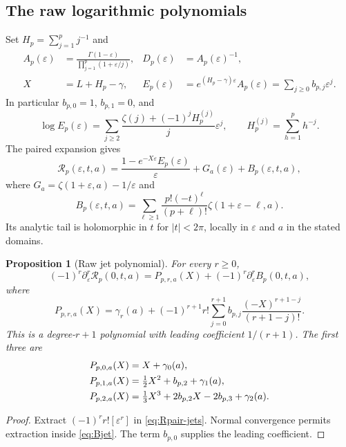\documentclass[11pt,a4paper]{article}
\numberwithin{equation}{section}
\newtheorem{proposition}[theorem]{Proposition}
\theoremstyle{definition}
\theoremstyle{remark}
\newcommand{\eps}{\varepsilon}
\newcommand{\cR}{\mathcal R}
\begin{document}
\subsection{The raw logarithmic polynomials}

Set $H_p=\sum_{j=1}^p j^{-1}$ and
\begin{align}
 A_p(\eps)&=\frac{\Gamma(1-\eps)}{\prod_{j=1}^p(1+\eps/j)},&
 D_p(\eps)&=A_p(\eps)^{-1},\label{eq:AD}\\
 X&=L+H_p-\gamma,&
 E_p(\eps)&=e^{(H_p-\gamma)\eps}A_p(\eps)
   =\sum_{j\ge0}b_{p,j}\eps^j.\label{eq:centeredE}
\end{align}
In particular $b_{p,0}=1$, $b_{p,1}=0$, and
\begin{equation}\label{eq:Elog}
 \log E_p(\eps)=\sum_{j\ge2}
 \frac{\zeta(j)+(-1)^jH_p^{(j)}}{j}\eps^j,
 \qquad H_p^{(j)}=\sum_{h=1}^p h^{-j}.
\end{equation}
The paired expansion gives
\begin{equation}\label{eq:Rpair-jets}
 \cR_p(\eps,t,a)=
 \frac{1-e^{-X\eps}E_p(\eps)}{\eps}+G_a(\eps)
 +B_p(\eps,t,a),
\end{equation}
where $G_a=\zeta(1+\eps,a)-1/\eps$ and
\begin{equation}\label{eq:Bjet}
 B_p(\eps,t,a)=\sum_{\ell\ge1}
 \frac{p!(-t)^\ell}{(p+\ell)!}\zeta(1+\eps-\ell,a).
\end{equation}
Its analytic tail is holomorphic in $t$ for $|t|<2\pi$, locally in
$\eps$ and $a$ in the stated domains.

\begin{proposition}[Raw jet polynomial]\label{prop:rawjet}
For every $r\ge0$,
\begin{equation}\label{eq:rawjet}
 (-1)^r\partial_\eps^r\cR_p(0,t,a)
  =P_{p,r,a}(X)+(-1)^r\partial_\eps^rB_p(0,t,a),
\end{equation}
where
\begin{equation}\label{eq:Praw}
 P_{p,r,a}(X)=\gamma_r(a)+(-1)^{r+1}r!
   \sum_{j=0}^{r+1}b_{p,j}
       \frac{(-X)^{r+1-j}}{(r+1-j)!}.
\end{equation}
This is a degree-$r+1$ polynomial with leading coefficient $1/(r+1)$.
The first three are
\begin{align}
 P_{p,0,a}(X)&=X+\gamma_0(a),\notag\\
 P_{p,1,a}(X)&=\tfrac12X^2+b_{p,2}+\gamma_1(a),\label{eq:raw-examples}\\
 P_{p,2,a}(X)&=\tfrac13X^3+2b_{p,2}X-2b_{p,3}+\gamma_2(a).\notag
\end{align}
\end{proposition}
\begin{proof}
Extract $(-1)^rr![\eps^r]$ in \eqref{eq:Rpair-jets}.
Normal convergence permits extraction inside \eqref{eq:Bjet}.
The term $b_{p,0}$ supplies the leading coefficient.
\end{proof}
\end{document}
